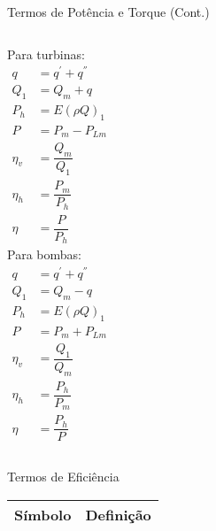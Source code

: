     \begin{frame}{Termos de Potência e Torque (Cont.)}\vspace*{-1em}
        \begin{columns}
            Para turbinas:
            \begin{align*}
                q &= q^{'} + q^{''} \\
                Q_1 &= Q_m + q \\
                P_h &= E(\rho Q)_1 \\
                P &= P_m - P_{Lm} \\
                \eta_v &= \dfrac{Q_m}{Q_1} \\
                \eta_h &= \dfrac{P_m}{P_h} \\
                \eta &= \dfrac{P}{P_h}
            \end{align*}
            Para bombas:
            \begin{align*}
                q &= q^{'} + q^{''} \\
                Q_1 &= Q_m - q \\
                P_h &= E(\rho Q)_1 \\
                P &= P_m + P_{Lm} \\
                \eta_v &= \dfrac{Q_1}{Q_m} \\
                \eta_h &= \dfrac{P_h}{P_m} \\
                \eta &= \dfrac{P_h}{P}
            \end{align*}
        \end{columns}
    \end{frame}

    \begin{frame}{Termos de Eficiência}\vspace*{-1em}
        \setlength{\tabcolsep}{2mm}
        \noindent\begin{longtable}{cp{110mm}}
            \alert{Símbolo} & \alert{Definição} \\
            \hline
            \hline
        \end{longtable}
    \end{frame}

